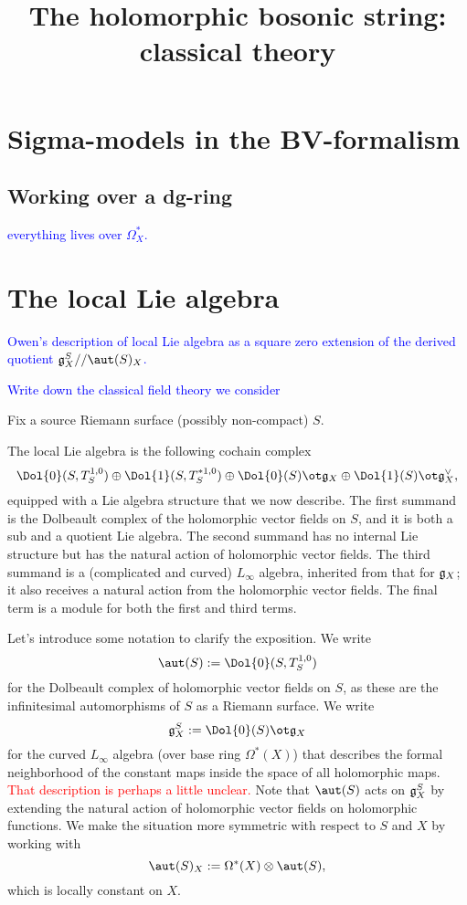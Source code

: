 \documentclass[10pt]{amsart}
\title{The holomorphic bosonic string: classical theory}
\def\brian{\textcolor{blue}}
\def\owen{\textcolor{red}}
\begin{document}
\maketitle

\section{Sigma-models in the BV-formalism}

\subsection{Working over a dg-ring}
\brian{everything lives over $\Omega^*_X$.}

\section{The local Lie algebra}
\brian{Owen's description of local Lie algebra as a square zero
  extension of the derived quotient
  $\fg_X^S // \aut(S)_X$.}

\brian{Write down the classical field theory we consider}

Fix a source Riemann surface (possibly non-compact) $S$. 

The local Lie algebra is the following cochain complex
\[
\Dol{0}(S,T^{1,0}_S) \oplus \Dol{1}(S, T^{\ast 1,0}_S) \oplus \Dol{0}(S) \ot \fg_X \oplus \Dol{1}(S) \ot \fg_X^\vee,
\]
equipped with a Lie algebra structure that we now describe. The first summand is the Dolbeault complex of the holomorphic vector fields on $S$, and it is both a sub and a quotient Lie algebra. The second summand has no internal Lie structure but has the natural action of holomorphic vector fields. The third summand is a (complicated and curved) $L_\infty$ algebra, inherited from that for $\mathfrak g_X$; it also receives a natural action from the holomorphic vector fields. The final term is a module for both the first and third terms.

Let's introduce some notation to clarify the exposition. We write
\[
\aut(S) := \Dol{0}(S,T^{1,0}_S)
\]
for the Dolbeault complex of holomorphic vector fields on $S$, as these are the infinitesimal automorphisms of $S$ as a Riemann surface. We write
\[
\fg_X^S := \Dol{0}(S) \ot \fg_X
\]
for the curved $L_\infty$ algebra (over base ring $\Omega^\ast(X)$) that describes the formal neighborhood of the constant maps inside the space of all holomorphic maps. \owen{That description is perhaps a little unclear.} Note that $\aut(S)$ acts on $\mathfrak g_X^S$ by extending the natural action of holomorphic vector fields on holomorphic functions. We make the situation more symmetric with respect to $S$ and $X$ by working with 
\[
\aut(S)_X := \Omega^*(X) \otimes \aut(S),
\]
which is locally constant on $X$. 
\end{document}
